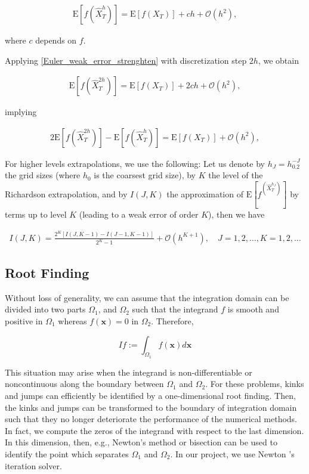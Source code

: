 \documentclass[11pt]{article}
\newcommand{\expt}[1]{\mathrm{E}\left[#1\right]}
\newcommand{\COMMA}{,}
\newcommand{\Ordo}[1]{{\mathcal{O}}\left(#1\right)}
\begin{document}
\begin{align}\label{Euler_weak_error_strenghten}
	\expt{f(\hat{X}_T^h)}= \expt{f(X_T)} + c h +\Ordo{h^2} \COMMA
\end{align}


where $c$ depends on $f$. 

Applying \ref{Euler_weak_error_strenghten} with discretization step $2h$, we  obtain

\begin{align}\label{Euler_weak_error_strenghten_2h}
	\expt{f(\hat{X}_T^{2h})}= \expt{f(X_T)} + 2 c h +\Ordo{h^2} \COMMA
\end{align}

implying

\begin{align}\label{Richardson_extrapol}
	2 \expt{f(\hat{X}_T^{2h})}- \expt{f(\hat{X}_T^{h})} =\expt{f(X_T)} + \Ordo{h^2} \COMMA
\end{align}

For higher levels extrapolations, we use the following: Let us denote by $h_J=h_0.2^{-J}$ the grid sizes (where $h_0$ is the coarsest grid size), by $K$ the level of the Richardson extrapolation, and by $I(J,K)$ the approximation of $\expt{f^(\hat{X}_T^{h_J})}$ by terms up to level $K$ (leading to a weak error of order $K$), then we have

\begin{align}
	I(J,K)=\frac{2^K\left[I(J,K-1)-I(J-1,K-1)\right]}{2^K-1} +\Ordo{h^{K+1}},\quad J=1,2,\dots, K=1,2,\dots
\end{align}

\subsection{Root Finding}\label{sec: Root Finding}
Without loss of generality, we can assume that the integration domain  can
be divided into two parts $\Omega_1$, and $\Omega_2$ such that the integrand $f$ is smooth and positive in $\Omega_1$
whereas $f(\mathbf{x}) = 0$ in $\Omega_2$. Therefore,

\begin{equation}
I f := \int_{\Omega_1} f(\mathbf{x}) d \mathbf{x}
\end{equation}

This situation may arise when the integrand is non-differentiable or noncontinuous along the boundary between $\Omega_1$ and $\Omega_2$. For these problems, kinks and jumps can efficiently be identified by a one-dimensional root finding. Then, the kinks and jumps can
be transformed to the boundary of integration domain such that they no longer deteriorate the performance of the numerical methods. In fact, we  compute the zeros of the integrand  with respect to  the last dimension. In this dimension, then, e.g., Newton's method or bisection can be used to identify the point which separates $\Omega_1$ and $\Omega_2$. In our project, we use Newton 's iteration solver.
\end{document}
